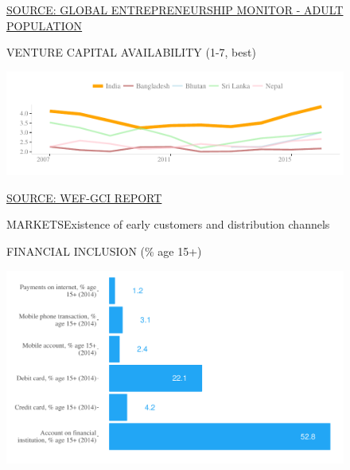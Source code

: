 \documentclass{article}\usepackage[]{graphicx}\usepackage[]{color}
\makeatletter
\def\maxwidth{ %
  \ifdim\Gin@nat@width>\linewidth
    \linewidth
  \else
    \Gin@nat@width
  \fi
}
\makeatother
\begin{document}
\begin{figure}
\begin{minipage}[c]{0.95\textwidth}
\begin{minipage}[c]{0.95\textwidth}
\begin{minipage}[c]{0.49\textwidth}
      \vspace*{-0.2cm} 
      \scriptsize{\href{NA}{\textcolor[HTML]{22A6F5}{SOURCE: GLOBAL ENTREPRENEURSHIP MONITOR - ADULT POPULATION}}}
    \end{minipage}
    \begin{minipage}[c]{0.49\textwidth} %
      \small{\textcolor[HTML]{818181}{VENTURE CAPITAL AVAILABILITY (1-7, best)}}


{\centering \includegraphics[width=\maxwidth]{figure/line_chart_Finance2-1} 

}



      \vspace*{-0.2cm} 
      \scriptsize{\href{NA}{\textcolor[HTML]{22A6F5}{SOURCE: WEF-GCI REPORT}}}
    \end{minipage}
  \end{minipage}  
  
  \vspace{5ex}
  \begin{minipage}[b]{0.95\textwidth}
    \begin{flushleft}  
      \Large{\textcolor[HTML]{22A6F5}{MARKETS}}\hspace{2ex}\small{\textcolor[HTML]{818181} {Existence of early customers and distribution channels}}
    \end{flushleft}
    \begin{minipage}[c]{0.48\textwidth} %
      \small{\textcolor[HTML]{818181}{FINANCIAL INCLUSION (\% age 15+)}}


{\centering \includegraphics[width=\maxwidth]{figure/bar_chart_Markets-1} 

}
\end{minipage}
\end{minipage}
\end{minipage}
\end{figure}
\end{document}
